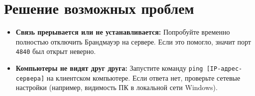 \documentclass[12pt,a4paper]{article}
\begin{document}
\section{Решение возможных проблем}
\begin{itemize}
    \item \textbf{Связь прерывается или не устанавливается:} Попробуйте временно полностью отключить Брандмауэр на сервере. Если это помогло, значит порт \texttt{4840} был открыт неверно.
    \item \textbf{Компьютеры не видят друг друга:} Запустите команду \texttt{ping [IP-адрес-сервера]} на клиентском компьютере. Если ответа нет, проверьте сетевые настройки (например, видимость ПК в локальной сети Windows).
\end{itemize}
\end{document}
